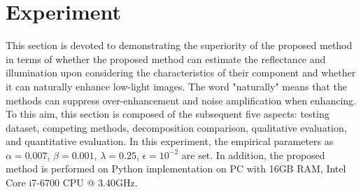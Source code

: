 \chapter{Experiment}
\label{sec:experiment}
This section is devoted to demonstrating the superiority of the proposed method in terms of whether the proposed method can estimate the reflectance and illumination upon considering the characteristics of their component and whether it can naturally enhance low-light images. The word "naturally" means that the methods can suppress over-enhancement and noise amplification when enhancing. 
To this aim, this section is composed of the subsequent five aspects: testing dataset, competing methods, decomposition comparison, qualitative evaluation, and quantitative evaluation.
In this experiment, the empirical parameters as $\alpha=0.007$, $\beta=0.001$, $\lambda=0.25$, $\epsilon=10^{-2}$ are set. In addition, the proposed method is performed on Python implementation on PC with 16GB RAM, Intel Core i7-6700 CPU @ 3.40GHz. 

